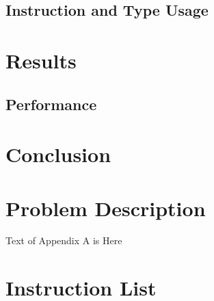 \documentclass[english,a4paper]{report}
\begin{document}
\section{Instruction and Type Usage}


\chapter{Results}

\section{Performance}

\chapter{Conclusion}

\newpage{}
\appendix
\chapter{Problem Description} 

Text of Appendix A is Here

\chapter{Instruction List} 
\end{document}
